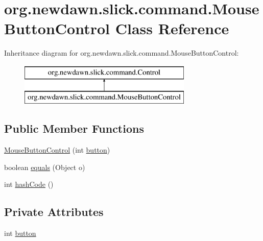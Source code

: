 \hypertarget{classorg_1_1newdawn_1_1slick_1_1command_1_1_mouse_button_control}{}\section{org.\+newdawn.\+slick.\+command.\+Mouse\+Button\+Control Class Reference}
\label{classorg_1_1newdawn_1_1slick_1_1command_1_1_mouse_button_control}
Inheritance diagram for org.\+newdawn.\+slick.\+command.\+Mouse\+Button\+Control\+:\begin{figure}[H]
\begin{center}
\leavevmode
\includegraphics[height=2.000000cm]{classorg_1_1newdawn_1_1slick_1_1command_1_1_mouse_button_control}
\end{center}
\end{figure}
\subsection*{Public Member Functions}
\begin{DoxyCompactItemize}
\item 
\mbox{\hyperlink{classorg_1_1newdawn_1_1slick_1_1command_1_1_mouse_button_control_a47ab20a1f4c08a5fc9201c2e14511fe2}{Mouse\+Button\+Control}} (int \mbox{\hyperlink{classorg_1_1newdawn_1_1slick_1_1command_1_1_mouse_button_control_acb6114b65f6e0fd07d4d820d6bd2c04c}{button}})
\item 
boolean \mbox{\hyperlink{classorg_1_1newdawn_1_1slick_1_1command_1_1_mouse_button_control_afa555e10d087536374f9590a08dfb529}{equals}} (Object o)
\item 
int \mbox{\hyperlink{classorg_1_1newdawn_1_1slick_1_1command_1_1_mouse_button_control_a8b1f339ce68b34c459cc8202e138ecdf}{hash\+Code}} ()
\end{DoxyCompactItemize}
\subsection*{Private Attributes}
\begin{DoxyCompactItemize}
\item 
int \mbox{\hyperlink{classorg_1_1newdawn_1_1slick_1_1command_1_1_mouse_button_control_acb6114b65f6e0fd07d4d820d6bd2c04c}{button}}
\end{DoxyCompactItemize}


